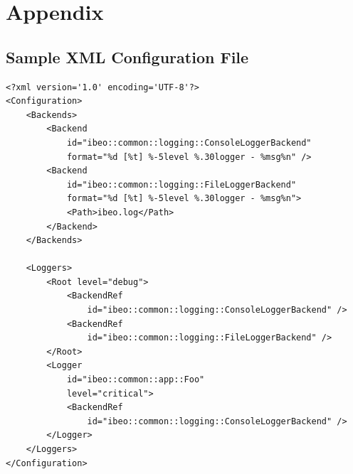 \newpage



\appendix
\section{Appendix}

\subsection{Sample XML Configuration File} \label{sec:samplexmlconfigurationfile}
\begin{lstlisting}[numbers=none]
<?xml version='1.0' encoding='UTF-8'?>
<Configuration>
	<Backends>
		<Backend
			id="ibeo::common::logging::ConsoleLoggerBackend"
			format="%d [%t] %-5level %.30logger - %msg%n" />
		<Backend
			id="ibeo::common::logging::FileLoggerBackend"
			format="%d [%t] %-5level %.30logger - %msg%n">
			<Path>ibeo.log</Path>
		</Backend>
	</Backends>
	
	<Loggers>
		<Root level="debug">
			<BackendRef
				id="ibeo::common::logging::ConsoleLoggerBackend" />
			<BackendRef
				id="ibeo::common::logging::FileLoggerBackend" />
		</Root>
		<Logger 
			id="ibeo::common::app::Foo"
			level="critical">
			<BackendRef
				id="ibeo::common::logging::ConsoleLoggerBackend" />
		</Logger>
	</Loggers>
</Configuration>
\end{lstlisting}
